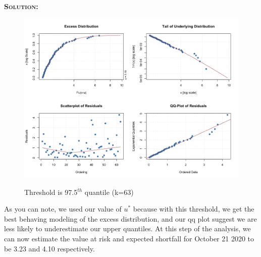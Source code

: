 \documentclass[12pt,oneside]{article}
\newenvironment{solution}
    {\textbf{\textsc{Solution:}}\\}
    {\newpage}
\begin{document}
\begin{solution}
\begin{figure}[H]
\begin{center}
{\includegraphics[width=4.5in]{Assignments/a4/97quant-days-gp.png}}
\caption{Threshold is 97.5$^{th}$ quantile (k=63)}
\end{center}
\end{figure}

As you can note, we used our value of $u^*$ because with this threshold, we get the best behaving modeling of the excess distribution, and our qq plot suggest we are less likely to underestimate our upper quantiles. At this step of the analysis, we can now estimate the value at risk and expected shortfall for October 21 2020 to be 3.23 and 4.10 respectively.


\end{solution}
\end{document}
